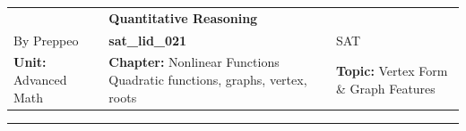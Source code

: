 \documentclass[11pt,paper=a4,answers]{exam}
\begin{document}
\begin{center}
    \centering
    \renewcommand{\arraystretch}{1.5}
    \begin{tabularx}{\textwidth}{YYY}
    & \normalsize\bf{{\Large{{Quantitative Reasoning}}}} & \\
    By Preppeo & \normalsize\bf{{sat\_lid\_021}} & SAT\\
    \normalsize{{\textbf{{Unit:}} Advanced Math}} & \normalsize{{\textbf{{Chapter:}} Nonlinear Functions	Quadratic functions, graphs, vertex, roots}} & \normalsize{{\textbf{{Topic:}} Vertex Form \& Graph Features}} \\
    \end{tabularx}
\end{center}
\par\noindent\rule{\textwidth}{1pt}
\end{document}
